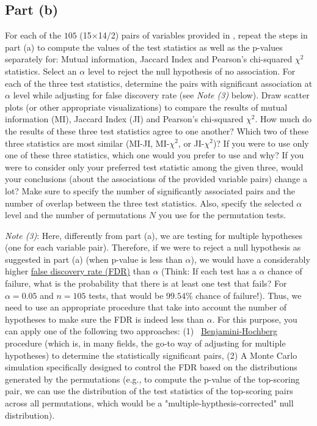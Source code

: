 \documentclass[11pt]{article}
\begin{document}
\subsection{Part (b)}
For each of the $105$ (15$\times$14/2) pairs of variables provided in \filenameB, repeat the steps in part (a) to compute the values of the test statistics as well as the p-values separately for: Mutual information, Jaccard Index and Pearson's chi-squared $\chi^2$ statistics. Select an $\alpha$ level to reject the null hypothesis of no association. For each of the three test statistics, determine the pairs with significant association at $\alpha$ level while adjusting for false discovery rate (see \textit{Note (3)} below). Draw scatter plots (or other appropriate visualizations) to compare the results of mutual information (MI), Jaccard Index (JI) and Pearson's chi-squared $\chi^2$. How much do the results of these three test statistics agree to one another? Which two of these three statistics are most similar (MI-JI, MI-$\chi^2$, or JI-$\chi^2$)? If you were to use only one of these three statistics, which one would you prefer to use and why? If you were to consider only your preferred test statistic among the given three, would your conclusions (about the associations of the provided variable pairs) change a lot? Make sure to specify the number of significantly associated pairs and the number of overlap between the three test statistics. Also, specify the selected $\alpha$ level and the number of permutations $N$ you use for the permutation tests.

\vspace{0.2cm}
\noindent
\textit{Note (3)}: Here, differently from part (a), we are testing for multiple hypotheses (one for each variable pair). Therefore, if we were to reject a null hypothesis as suggested in part (a) (when p-value is less than $\alpha$), we would have a considerably higher \href{https://en.wikipedia.org/wiki/False_discovery_rate}{false discovery rate (FDR)} than $\alpha$ (Think: If each test has a $\alpha$ chance of failure, what is the probability that there is at least one test that fails? For $\alpha = 0.05$ and $n=105$ tests, that would be $99.54\%$ chance of failure!). Thus, we need to use an appropriate procedure that take into account the number of hypotheses to make sure the FDR is indeed less than $\alpha$. For this purpose, you can apply one of the following two approaches: (1)~ \href{https://en.wikipedia.org/wiki/False_discovery_rate#Benjamini\%E2\%80\%93Hochberg_procedure}{Benjamini-Hochberg} procedure (which is, in many fields, the go-to way of adjusting for multiple hypotheses) to determine the statistically significant pairs, (2) A Monte Carlo simulation  specifically designed to control the FDR based on the distributions generated by the permutations (e.g., to compute the p-value of the top-scoring pair, we can use the distribution of the test statistics of the top-scoring pairs across all permutations, which would be a "multiple-hypthesis-corrected" null distribution).
\end{document}
